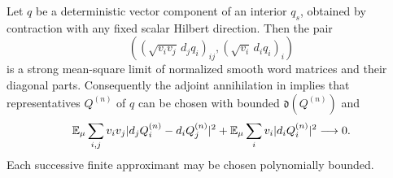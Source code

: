 \begin{lemma}\label{lem:exact-form-closure}
Let $q$ be a deterministic vector component of an interior $q_s$, obtained
by contraction with any fixed scalar Hilbert direction.  Then the pair
\[
 \left((\sqrt{v_iv_j}\,d_jq_i)_{ij},
       (\sqrt{v_i}\,d_iq_i)_i\right)
\]
is a strong mean-square limit of normalized smooth word matrices and
their diagonal parts.  Consequently the adjoint annihilation in
 implies that representatives $Q^{(n)}$ of $q$
can be chosen with bounded $\mathfrak d(Q^{(n)})$ and
\begin{equation}\label{eq:exact-vanishing-curl}
 \mathbb E_\mu\sum_{i,j}v_iv_j|d_jQ_i^{(n)}-d_iQ_j^{(n)}|^2
 +\mathbb E_\mu\sum_i v_i|d_iQ_i^{(n)}|^2\longrightarrow0.
\end{equation}
Each successive finite approximant may be chosen polynomially bounded.
\end{lemma}

